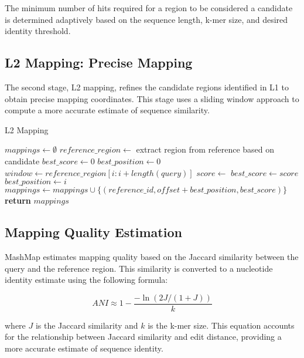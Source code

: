 \documentclass{article}
\begin{document}
The minimum number of hits required for a region to be considered a candidate is determined adaptively based on the sequence length, k-mer size, and desired identity threshold.

\subsection{L2 Mapping: Precise Mapping}

The second stage, L2 mapping, refines the candidate regions identified in L1 to obtain precise mapping coordinates. This stage uses a sliding window approach to compute a more accurate estimate of sequence similarity.

\begin{algorithm}
\caption{L2 Mapping}
\begin{algorithmic}[1]
\State $mappings \gets \emptyset$
    \State $reference\_region \gets$ extract region from reference based on candidate
    \State $best\_score \gets 0$
    \State $best\_position \gets 0$
        \State $window \gets reference\_region[i:i+length(query)]$
        \State $score \gets$ 
            \State $best\_score \gets score$
            \State $best\_position \gets i$
        \EndIf
    \EndFor
        \State $mappings \gets mappings \cup \{(reference\_id, offset + best\_position, best\_score)\}$
    \EndIf
\EndFor
\State \textbf{return} $mappings$
\EndProcedure
\end{algorithmic}
\end{algorithm}

\subsection{Mapping Quality Estimation}

MashMap estimates mapping quality based on the Jaccard similarity between the query and the reference region. This similarity is converted to a nucleotide identity estimate using the following formula:

\begin{equation}
ANI \approx 1 - \frac{-\ln(2J/(1+J))}{k}
\end{equation}

where $J$ is the Jaccard similarity and $k$ is the k-mer size. This equation accounts for the relationship between Jaccard similarity and edit distance, providing a more accurate estimate of sequence identity.
\end{document}
